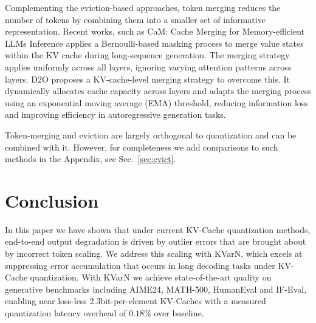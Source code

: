 \documentclass{article}
\newcommand{\methodname}{KVarN\xspace}
\begin{document}
Complementing the eviction-based approaches, token merging reduces the number of tokens by combining them into a smaller set of informative representation. Recent works, such as CaM: Cache Merging for Memory-efficient LLMs Inference \cite{zhang2024cam} applies a Bernoulli-based masking process to merge value states within the KV cache during long-sequence generation. The merging strategy applies uniformly across all layers, ignoring varying attention patterns across layers.
D2O \cite{wan2025textdtexto_d2o} proposes a KV-cache-level merging strategy to overcome this. It dynamically allocates cache capacity across layers and adapts the merging process using an exponential moving average (EMA) threshold, reducing information loss and improving efficiency in autoregressive generation tasks.

Token-merging and eviction are largely orthogonal to quantization and can be combined with it. However, for completeness we add comparisons to such methods in the Appendix, see Sec.~\ref{sec:evict}.


\section{Conclusion}
In this paper we have shown that under current KV-Cache quantization methods, end-to-end output degradation is driven by outlier errors that are brought about by incorrect token scaling. 
We address this scaling with \methodname, which excels at suppressing error accumulation that occurs in long decoding tasks under KV-Cache quantization.
With \methodname we achieve state-of-the-art quality on generative benchmarks including AIME24, MATH-500, HumanEval and IF-Eval, enabling near loss-less 2.3bit-per-element KV-Caches with a measured quantization latency overhead of $0.18\%$ over baseline.
\end{document}
